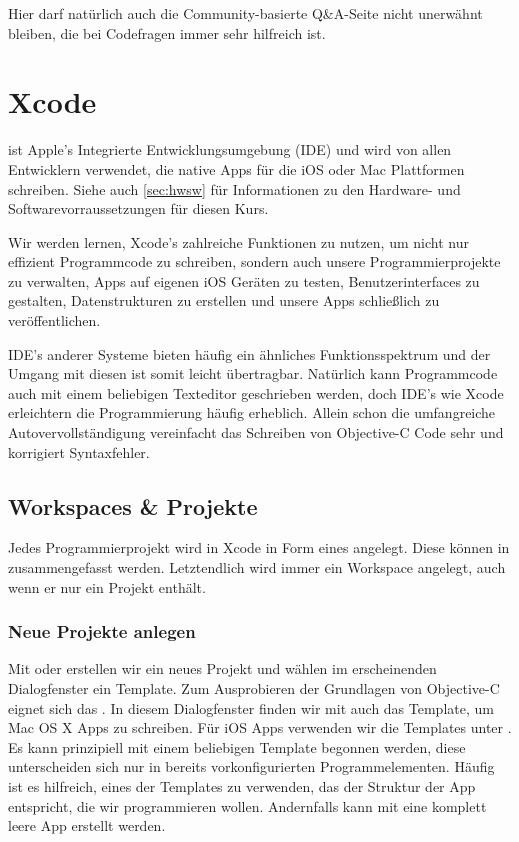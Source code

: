 \documentclass[parskip=half, final]{scrreprt}
\begin{document}
Hier darf natürlich auch die Community-basierte Q\&A-Seite  nicht unerwähnt bleiben, die bei Codefragen immer sehr hilfreich ist.


\chapter{Xcode}

 ist Apple's Integrierte Entwicklungsumgebung (IDE) und wird von allen Entwicklern verwendet, die native Apps für die iOS oder Mac Plattformen schreiben. Siehe auch \ref{sec:hwsw} für Informationen zu den Hardware- und Softwarevorraussetzungen für diesen Kurs.

Wir werden lernen, Xcode's zahlreiche Funktionen zu nutzen, um nicht nur effizient Programmcode zu schreiben, sondern auch unsere Programmierprojekte zu verwalten, Apps auf eigenen iOS Geräten zu testen, Benutzerinterfaces zu gestalten, Datenstrukturen zu erstellen und unsere Apps schließlich zu veröffentlichen.

IDE's anderer Systeme bieten häufig ein ähnliches Funktionsspektrum und der Umgang mit diesen ist somit leicht übertragbar. Natürlich kann Programmcode auch mit einem beliebigen Texteditor geschrieben werden, doch IDE's wie Xcode erleichtern die Programmierung häufig erheblich. Allein schon die umfangreiche Autovervollständigung vereinfacht das Schreiben von Objective-C Code sehr und korrigiert Syntaxfehler.

\section{Workspaces \& Projekte}

Jedes Programmierprojekt wird in Xcode in Form eines  angelegt. Diese können in  zusammengefasst werden. Letztendlich wird immer ein Workspace angelegt, auch wenn er nur ein Projekt enthält.

\subsection{Neue Projekte anlegen}

Mit  oder  erstellen wir ein neues Projekt und wählen im erscheinenden Dialogfenster  ein Template. Zum Ausprobieren der Grundlagen von Objective-C eignet sich das . In diesem Dialogfenster finden wir mit  auch das Template, um Mac OS X Apps zu schreiben. Für iOS Apps verwenden wir die Templates unter . Es kann prinzipiell mit einem beliebigen Template begonnen werden, diese unterscheiden sich nur in bereits vorkonfigurierten Programmelementen. Häufig ist es hilfreich, eines der Templates zu verwenden, das der Struktur der App entspricht, die wir programmieren wollen. Andernfalls kann mit  eine komplett leere App erstellt werden.
\end{document}
